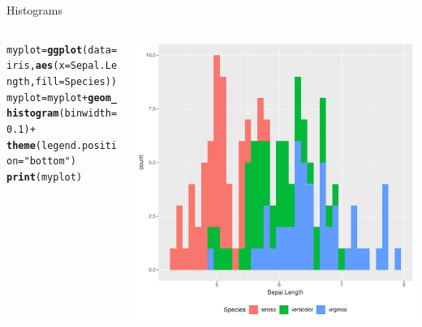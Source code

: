 \documentclass[aspectratio=169]{beamer}\usepackage[]{graphicx}\usepackage[]{color}
\makeatletter
\def\maxwidth{ %
  \ifdim\Gin@nat@width>\linewidth
    \linewidth
  \else
    \Gin@nat@width
  \fi
}
\newcommand{\hlnum}[1]{\textcolor[rgb]{0.686,0.059,0.569}{#1}}%
\newcommand{\hlstr}[1]{\textcolor[rgb]{0.192,0.494,0.8}{#1}}%
\newcommand{\hlopt}[1]{\textcolor[rgb]{0,0,0}{#1}}%
\newcommand{\hlstd}[1]{\textcolor[rgb]{0.345,0.345,0.345}{#1}}%
\newcommand{\hlkwb}[1]{\textcolor[rgb]{0.69,0.353,0.396}{#1}}%
\newcommand{\hlkwc}[1]{\textcolor[rgb]{0.333,0.667,0.333}{#1}}%
\newcommand{\hlkwd}[1]{\textcolor[rgb]{0.737,0.353,0.396}{\textbf{#1}}}%
\newenvironment{kframe}{%
 \def\at@end@of@kframe{}%
 \ifinner\ifhmode%
  \def\at@end@of@kframe{\end{minipage}}%
  \begin{minipage}{\columnwidth}%
 \fi\fi%
 \def\FrameCommand##1{\hskip\@totalleftmargin \hskip-\fboxsep
 \colorbox{shadecolor}{##1}\hskip-\fboxsep
     \hskip-\linewidth \hskip-\@totalleftmargin \hskip\columnwidth}%
 \MakeFramed {\advance\hsize-\width
   \@totalleftmargin\z@ \linewidth\hsize
   \@setminipage}}%
 {\par\unskip\endMakeFramed%
 \at@end@of@kframe}
\newenvironment{knitrout}{}{} %
\makeatother
\begin{document}
\begin{frame}[fragile]{Histograms}
\begin{columns}
  \begin{column}{0.50\textwidth}
\begin{knitrout}\tiny
{}\color{fgcolor}\begin{kframe}
\begin{alltt}
\hlstd{myplot} \hlkwb{=} \hlkwd{ggplot}\hlstd{(}\hlkwc{data}\hlstd{=iris,} \hlkwd{aes}\hlstd{(}\hlkwc{x}\hlstd{=Sepal.Length,} \hlkwc{fill}\hlstd{=Species))}
\hlstd{myplot} \hlkwb{=} \hlstd{myplot} \hlopt{+} \hlkwd{geom_histogram}\hlstd{(}\hlkwc{binwidth} \hlstd{=} \hlnum{0.1}\hlstd{)} \hlopt{+}
  \hlkwd{theme}\hlstd{(}\hlkwc{legend.position}\hlstd{=}\hlstr{"bottom"}\hlstd{)}
\hlkwd{print}\hlstd{(myplot)}
\end{alltt}
\end{kframe}
\end{knitrout}
  \end{column}
  \begin{column}{0.5\textwidth}
\begin{knitrout}\scriptsize
{}\color{fgcolor}
\includegraphics[width=\maxwidth]{figure/unnamed-chunk-17-1} 

\end{knitrout}
  \end{column}
\end{columns}
\end{frame}
\end{document}
